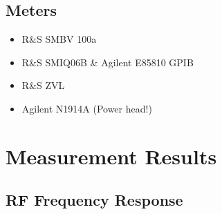 \documentclass[12pt,a4paper,parskip=full]{scrreprt}
\begin{document}
\section{Meters}
\begin{itemize}
    \item R\&S SMBV 100a
    \item R\&S SMIQ06B \& Agilent E85810 GPIB
    \item R\&S ZVL
    \item Agilent N1914A (Power head!)
\end{itemize}
\chapter{Measurement Results}
\section{RF Frequency Response}
\end{document}
